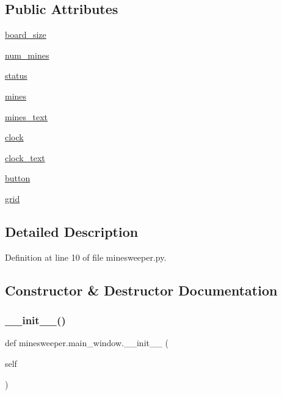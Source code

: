 \subsection*{Public Attributes}
\begin{DoxyCompactItemize}
\item 
\mbox{\hyperlink{classminesweeper_1_1main__window_ade30f8addf0e9207543b379de6c52fb2}{board\+\_\+size}}
\item 
\mbox{\hyperlink{classminesweeper_1_1main__window_ae651ccbb38021540ec18b0a56a942ba4}{num\+\_\+mines}}
\item 
\mbox{\hyperlink{classminesweeper_1_1main__window_a72c341956238afec0b65c3bcf150a5c5}{status}}
\item 
\mbox{\hyperlink{classminesweeper_1_1main__window_a2bbfbd041f86159c1d1e92c316751a1e}{mines}}
\item 
\mbox{\hyperlink{classminesweeper_1_1main__window_a8540aa4905d29c57ed6f06b5ea83d196}{mines\+\_\+text}}
\item 
\mbox{\hyperlink{classminesweeper_1_1main__window_a91ff7ce51e367576774601a2e4e0e86f}{clock}}
\item 
\mbox{\hyperlink{classminesweeper_1_1main__window_afc4066f75c60d0bcb2b26f8d42b05536}{clock\+\_\+text}}
\item 
\mbox{\hyperlink{classminesweeper_1_1main__window_a3abe52e9526bf23938970051738b223e}{button}}
\item 
\mbox{\hyperlink{classminesweeper_1_1main__window_af3442545ce0eb9a34a472f8096f2e92d}{grid}}
\end{DoxyCompactItemize}


\subsection{Detailed Description}


Definition at line 10 of file minesweeper.\+py.



\subsection{Constructor \& Destructor Documentation}
\mbox{\label{classminesweeper_1_1main__window_a233c53b9f3e9d9076ae9d82394c6d39d}} 
\subsubsection{\texorpdfstring{\_\_init\_\_()}{\_\_init\_\_()}}
{\footnotesize\ttfamily def minesweeper.\+main\+\_\+window.\+\_\+\+\_\+init\+\_\+\+\_\+ (\begin{DoxyParamCaption}\item[{}]{self }\end{DoxyParamCaption})}



